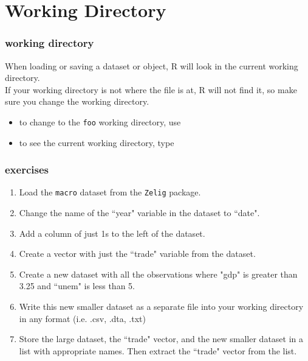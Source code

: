 \documentclass[handout]{beamer}
\newcommand{\red}{\color{red}}
\newcommand{\black}{\color{black}}
\begin{document}
\section{Working Directory}
\begin{frame}
\frametitle{working directory}
When loading or saving a dataset or object, R will look in the current working directory.\\
\pause
\bigskip
If your working directory is not where the file is at, R will not find it, so make sure you change the working directory.
\pause
\bigskip
\begin{itemize}
\item to change to the {\tt foo} working directory, use \red {\tt setwd("foo")} \black
\pause
\item to see the current working directory, type \red {\tt getwd()} \black
\end{itemize}
\end{frame}

\begin{frame}
\frametitle{exercises}
\begin{enumerate}
\item Load the {\tt macro} dataset from the {\tt Zelig} package.
\item Change the name of the ``year" variable in the dataset to ``date".
\item Add a column of just 1s to the left of the dataset.
\item Create a vector with just the ``trade" variable from the dataset.
\item Create a new dataset with all the observations where "gdp" is greater than 3.25 and ``unem" is less than 5.
\item Write this new smaller dataset as a separate file into your working directory in any format (i.e. .csv, .dta, .txt)
\item Store the large dataset, the ``trade" vector, and the new smaller dataset in a list with appropriate names.  Then extract the ``trade" vector from the list.
\end{enumerate}
\end{frame}
\end{document}
